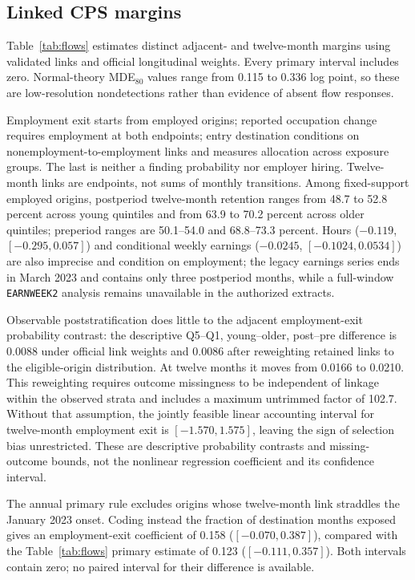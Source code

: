 \subsection{Linked CPS margins}

Table~\ref{tab:flows} estimates distinct adjacent- and twelve-month margins using validated links and official longitudinal weights.  Every primary interval includes zero.  Normal-theory MDE$_{80}$ values range from 0.115 to 0.336 log point, so these are low-resolution nondetections rather than evidence of absent flow responses.



Employment exit starts from employed origins; reported occupation change requires employment at both endpoints; entry destination conditions on nonemployment-to-employment links and measures allocation across exposure groups.  The last is neither a finding probability nor employer hiring.  Twelve-month links are endpoints, not sums of monthly transitions.  Among fixed-support employed origins, postperiod twelve-month retention ranges from 48.7 to 52.8 percent across young quintiles and from 63.9 to 70.2 percent across older quintiles; preperiod ranges are 50.1--54.0 and 68.8--73.3 percent.  Hours ($-0.119$, $[-0.295,0.057]$) and conditional weekly earnings ($-0.0245$, $[-0.1024,0.0534]$) are also imprecise and condition on employment; the legacy earnings series ends in March 2023 and contains only three postperiod months, while a full-window
\texttt{EARNWEEK2} analysis remains unavailable in the authorized extracts.

Observable poststratification does little to the adjacent employment-exit
probability contrast: the descriptive Q5--Q1, young--older, post--pre difference
is 0.0088 under official link weights and 0.0086 after reweighting retained
links to the eligible-origin distribution.  At twelve months it moves from
0.0166 to 0.0210.  This reweighting requires outcome missingness to be
independent of linkage within the observed strata and includes a maximum
untrimmed factor of 102.7.  Without that assumption, the jointly feasible
linear accounting interval for twelve-month employment exit is
$[-1.570,1.575]$, leaving the sign of selection bias unrestricted.  These are
descriptive probability contrasts and missing-outcome bounds, not the nonlinear
regression coefficient and its confidence interval.

The annual primary rule excludes origins whose twelve-month link straddles the
January 2023 onset.  Coding instead the fraction of destination months exposed
gives an employment-exit coefficient of 0.158 ($[-0.070,0.387]$), compared
with the Table~\ref{tab:flows} primary estimate of 0.123
($[-0.111,0.357]$).  Both intervals contain zero;
no paired interval for their difference is available.

